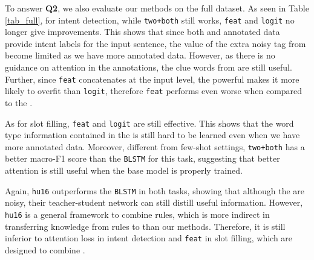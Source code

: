 To answer \textbf{Q2}, we also evaluate our methods on the full dataset. As seen in Table \ref{tab_full}, for intent detection, while
\texttt{two+both} still works, \texttt{feat} and \texttt{logit} no longer give improvements.
This shows that since both \REtag and annotated data provide intent labels for the input sentence, the value of the extra noisy tag from \RE become limited as we have more annotated data.
However, as there is no guidance on attention in the annotations, the clue words from \REs are still useful. Further, since \texttt{feat}
concatenates \REtags at the input level, the powerful \NN makes it more likely to overfit than \texttt{logit}, therefore \texttt{feat}
performs even worse when compared to the \BLSTM.

As for slot filling, \texttt{feat} and \texttt{logit} are still effective. This shows that the word type information contained in the
\REtags is still hard to be learned even when we have more annotated data.
Moreover, different from few-shot settings, \texttt{two+both} has a better macro-F1 score than the \texttt{BLSTM} for this task, suggesting
that better attention is still useful when the base model is properly trained.

Again, \texttt{hu16} outperforms the \texttt{BLSTM} in both tasks, showing that although the \REtags are noisy, their teacher-student
network can still distill useful information. However, \texttt{hu16} is a general framework to combine \FOL rules, which is more indirect
in transferring knowledge from rules to \NN than our methods. Therefore, it is still  inferior to attention loss in intent detection and
\texttt{feat} in slot filling, which are designed to combine \REs.

